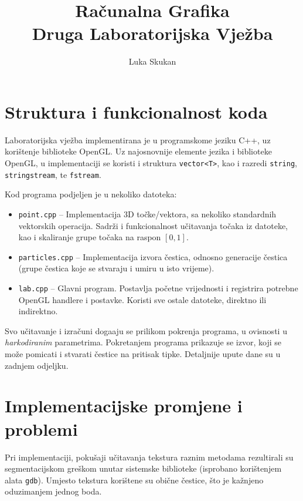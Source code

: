 \documentclass[10pt,a4paper]{article}
\author{Luka Skukan}
\title{Ra\v{c}unalna Grafika\\Druga Laboratorijska Vje\v{z}ba}
\date{}
\begin{document}
\maketitle

\section{Struktura i funkcionalnost koda}
Laboratorijska vje\v{z}ba implementirana je u programskome jeziku C++, uz kori\v{s}tenje biblioteke OpenGL. Uz najosnovnije elemente jezika i biblioteke OpenGL, u implementaciji se koristi i struktura \texttt{vector<T>}, kao i razredi \texttt{string}, \texttt{stringstream}, te \texttt{fstream}.

\noindent
Kod programa podjeljen je u nekoliko datoteka:

\begin{itemize}
    \item \texttt{point.cpp} -- Implementacija 3D to\v{c}ke/vektora, sa nekoliko standardnih vektorskih operacija. Sadr\v{z}i i funkcionalnost u\v{c}itavanja to\v{c}aka iz datoteke, kao i skaliranje grupe to\v{c}aka na raspon $[0, 1]$.
	\item \texttt{particles.cpp} -- Implementacija izvora \v{c}estica, odnosno generacije \v{c}estica (grupe \v{c}estica koje se stvaraju i umiru u isto vrijeme).
    \item \texttt{lab.cpp} -- Glavni program. Postavlja po\v{c}etne vrijednosti i registrira potrebne OpenGL handlere i postavke. Koristi sve ostale datoteke, direktno ili indirektno.
\end{itemize}

Svo u\v{c}itavanje i izra\v{c}uni doga\dj{}aju se prilikom pokrenja programa, u ovisnosti u \emph{harkodiranim} parametrima. Pokretanjem programa prikazuje se izvor, koji se mo\v{z}e pomicati i stvarati \v{c}estice na pritisak tipke. Detaljnije upute dane su u zadnjem odjeljku.

\section{Implementacijske promjene i problemi}

Pri implementaciji, poku\v{s}aji u\v{c}itavanja tekstura raznim metodama rezultirali su segmentacijskom gre\v{s}kom unutar sistemske biblioteke (isprobano kori\v{s}tenjem alata \texttt{gdb}). Umjesto tekstura kori\v{s}tene su obi\v{c}ne \v{c}estice, \v{s}to je ka\v{z}njeno oduzimanjem jednog boda.
\end{document}
